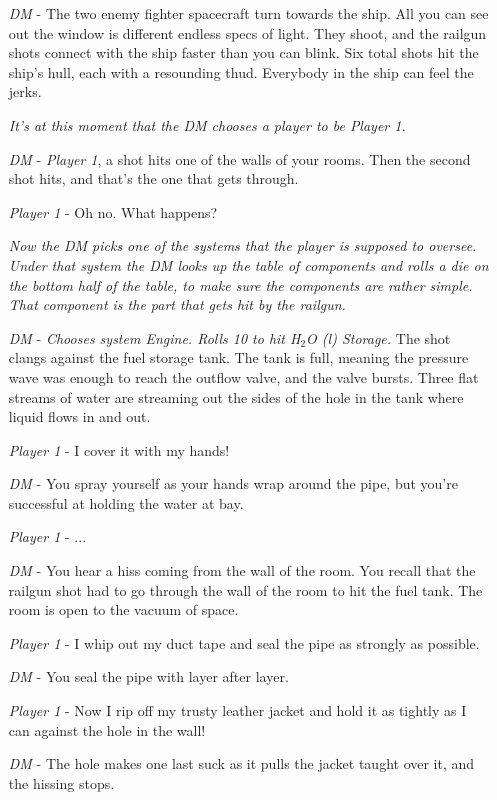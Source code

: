 \documentclass[a4paper]{article}
\begin{document}
\begin{enumerate}[leftmargin=2cm]
\item [\textit{DM}] - The two enemy fighter spacecraft turn towards the ship. All you can see out the window is different endless specs of light. They shoot, and the railgun shots connect with the ship faster than you can blink. Six total shots hit the ship's hull, each with a resounding thud. Everybody in the ship can feel the jerks. 
\item [] \textit{It's at this moment that the DM chooses a player to be Player 1.} 
\item [\textit{DM}] - \textit{Player 1}, a shot  hits one of the walls of your rooms. Then the second shot hits, and that's the one that gets through.
\item [\textit{Player 1}] - Oh no. What happens?
\item [] \textit{Now the DM picks one of the systems that the player is supposed to oversee. Under that system the DM looks up the table of components and rolls a die on the bottom half of the table, to make sure the components are rather simple. That component is the part that gets hit by the railgun.}
\item [\textit{DM}] - \textit{Chooses system Engine. Rolls 10 to hit H$_2$O (l) Storage.} The shot clangs against the fuel storage tank. The tank is full, meaning the pressure wave was enough to reach the outflow valve, and the valve bursts. Three flat streams of water are streaming out the sides of the hole in the tank where liquid flows in and out.
\item [\textit{Player 1}] - I cover it with my hands! 
\item [\textit{DM}] - You spray yourself as your hands wrap around the pipe, but you're successful at holding the water at bay.
\item [\textit{Player 1}] - ...
\item [\textit{DM}] - You hear a hiss coming from the wall of the room. You recall that the railgun shot had to go through the wall of the room to hit the fuel tank. The room is open to the vacuum of space.
\item [\textit{Player 1}] - I whip out my duct tape and seal the pipe as strongly as possible.
\item [\textit{DM}] - You seal the pipe with layer after layer.
\item [\textit{Player 1}] - Now I rip off my trusty leather jacket and hold it as tightly as I can against the hole in the wall!
\item [\textit{DM}] - The hole makes one last suck as it pulls the jacket taught over it, and the hissing stops.

\end{enumerate}
\end{document}
